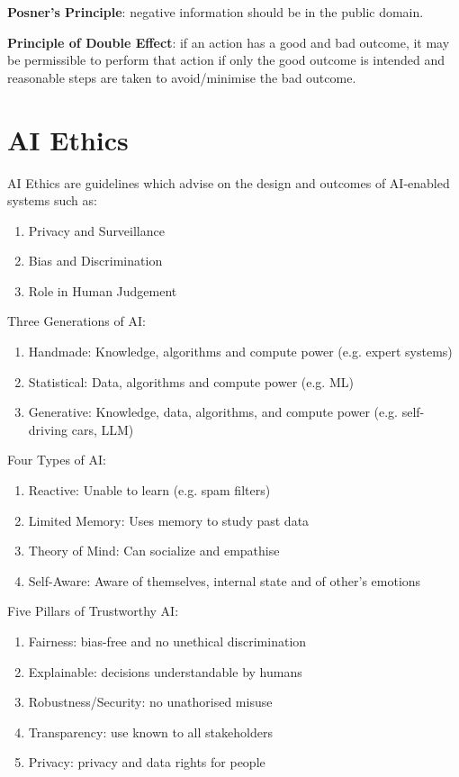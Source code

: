 \documentclass[12pt, a4paper]{article}
\begin{document}
\begin{multicols*}{3}
\vspace{1em}
\textbf{Posner's Principle}: negative information should be in the public domain.

\textbf{Principle of Double Effect}: if an action has a good and bad outcome, it may be permissible to perform that action if only the good outcome is intended and reasonable steps are taken to avoid/minimise the bad outcome.

\colbreak

\section{AI Ethics}
AI Ethics are guidelines which advise on the design and outcomes of AI-enabled systems such as:
\begin{enumerate}[\roman*.]
  \item Privacy and Surveillance
  \item Bias and Discrimination
  \item Role in Human Judgement
\end{enumerate}

Three Generations of AI:
\begin{enumerate}[\roman*.]
  \item Handmade: Knowledge, algorithms and compute power (e.g. expert systems)
  \item Statistical: Data, algorithms and compute power (e.g. ML)
  \item Generative: Knowledge, data, algorithms, and compute power (e.g. self-driving cars, LLM) 
\end{enumerate}

Four Types of AI:
\begin{enumerate}[\roman*.]
  \item Reactive: Unable to learn (e.g. spam filters)
  \item Limited Memory: Uses memory to study past data
  \item Theory of Mind: Can socialize and empathise
  \item Self-Aware: Aware of themselves, internal state and of other's emotions
\end{enumerate}

Five Pillars of Trustworthy AI:
\begin{enumerate}[\roman*.]
  \item Fairness: bias-free and no unethical discrimination 
  \item Explainable: decisions understandable by humans
  \item Robustness/Security: no unathorised misuse
  \item Transparency: use known to all stakeholders
  \item Privacy: privacy and data rights for people
\end{enumerate}


\end{multicols*}
\end{document}
